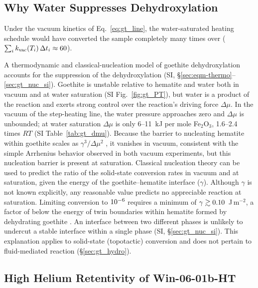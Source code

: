 \subsection{Why Water Suppresses Dehydroxylation}\label{sec:gt_nucleation}

Under the vacuum kinetics of Eq.~\eqref{eq:gt_line}, the water-saturated heating schedule would have
converted the sample completely many times over ($\sum_i k_{\mathrm{vac}}(T_i)\,\Delta t_i \approx 60$).

A thermodynamic and classical-nucleation model of goethite dehydroxylation accounts for the suppression of the
dehydroxylation (SI, \S\ref{sec:eqm-thermo}--\ref{sec:gt_nuc_si}). Goethite is unstable relative to hematite 
and water both in
vacuum and at water saturation (SI Fig.~\ref{fig:gt_PT}), but water is a product of the reaction and exerts
strong control over the reaction's driving force $\Delta\mu$. In the vacuum of the step-heating line, the water
pressure approaches zero and $\Delta\mu$ is unbounded; at water saturation $\Delta\mu$ is only 6--11~kJ per mole
Fe$_2$O$_3$, 1.6--2.4 times $RT$ (SI Table~\ref{tab:gt_dmu}). Because the barrier to nucleating hematite
within goethite scales as $\gamma^3/\Delta\mu^2$ \citep{turnbull1949}, it vanishes in vacuum, consistent
with the simple Arrhenius behavior observed in both vacuum experiments, but this nucleation barrier is present at saturation. 
Classical nucleation theory can be used to predict the ratio of the solid-state conversion rates in vacuum and at 
saturation, given the energy of the goethite--hematite interface ($\gamma$). Although $\gamma$ is not known explicitly, 
any reasonable value predicts no appreciable reaction at saturation. Limiting conversion to $10^{-6}$ requires a minimum 
of $\gamma\gtrsim0.10$~J\,m$^{-2}$, a factor of \ChTwoKinGammaRatio{} below the energy of twin
boundaries within hematite formed by dehydrating goethite \citep{saito2016}. An interface between
two different phases is unlikely to undercut a stable interface within a single phase (SI, \S\ref{sec:gt_nuc_si}). 
This explanation applies to solid-state (topotactic) conversion and does not pertain to fluid-mediated reaction (\S\ref{sec:gt_hydro}).

\subsection{\texorpdfstring{High Helium Retentivity of
Win-06-01b-HT}{ High Helium Retentivity of Win-06-01b-HT}}\label{high-helium-retentivity-of-win-06-01b-ht}

